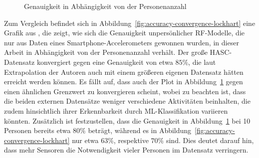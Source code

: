 \begin{figure}[h]
	\centering
	\caption{Genauigkeit in Abhängigkeit von der Personenanzahl}
	\label{fig:accuracy-convergence}
\end{figure}

Zum Vergleich befindet sich in Abbildung~\ref{fig:accuracy-convergence-lockhart} eine Grafik aus \cite{Lockhart2014}, die zeigt, wie sich die Genauigkeit unpersönlicher \ac{RF}-Modelle, die nur aus Daten eines Smartphone-Accelerometers gewonnen wurden, in dieser Arbeit in Abhängigkeit von der Personenanzahl verhält. Der große \acs{HASC}-Datensatz konvergiert gegen eine Genauigkeit von etwa $85 \%$, die laut Extrapolation der Autoren auch mit einem größeren eigenen Datensatz hätten erreicht werden können. Es fällt auf, dass auch der Plot in Abbildung~\ref{fig:accuracy-convergence} gegen einen ähnlichen Grenzwert zu konvergieren scheint, wobei zu beachten ist, dass die beiden externen Datensätze weniger verschiedene Aktivitäten beinhalten, die zudem hinsichtlich ihrer Erkennbarkeit durch \acs{ML}-Klassifikation variieren könnten. Zusätzlich ist festzustellen, dass die Genauigkeit in Abbildung~\ref{fig:accuracy-convergence} bei 10 Personen bereits etwa $80 \%$ beträgt, während es in Abbildung~\ref{fig:accuracy-convergence-lockhart} nur etwa $63 \%$, respektive $70 \%$ sind. Dies deutet darauf hin, dass mehr Sensoren die Notwendigkeit vieler Personen im Datensatz verringern.

